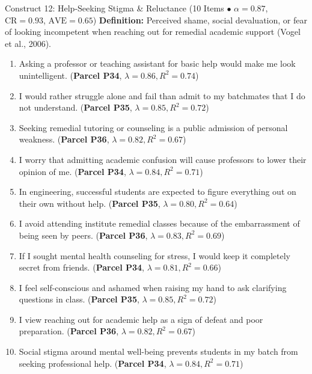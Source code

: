 \documentclass[10pt,a4paper]{article}
\begin{document}
\newpage
\begin{constructbox}{Construct 12: Help-Seeking Stigma \& Reluctance (10 Items $\bullet$ $\alpha = 0.87$, $\text{CR} = 0.93$, $\text{AVE} = 0.65$)}
\textbf{Definition:} Perceived shame, social devaluation, or fear of looking incompetent when reaching out for remedial academic support (Vogel et al., 2006).
\begin{enumerate}[label=\textbf{Q\arabic*.}, leftmargin=2.5em, itemsep=2pt, resume]
  \item Asking a professor or teaching assistant for basic help would make me look unintelligent. \hfill (\textbf{Parcel P34}, $\lambda = 0.86, R^2 = 0.74$)
  \item I would rather struggle alone and fail than admit to my batchmates that I do not understand. \hfill (\textbf{Parcel P35}, $\lambda = 0.85, R^2 = 0.72$)
  \item Seeking remedial tutoring or counseling is a public admission of personal weakness. \hfill (\textbf{Parcel P36}, $\lambda = 0.82, R^2 = 0.67$)
  \item I worry that admitting academic confusion will cause professors to lower their opinion of me. \hfill (\textbf{Parcel P34}, $\lambda = 0.84, R^2 = 0.71$)
  \item In engineering, successful students are expected to figure everything out on their own without help. \hfill (\textbf{Parcel P35}, $\lambda = 0.80, R^2 = 0.64$)
  \item I avoid attending institute remedial classes because of the embarrassment of being seen by peers. \hfill (\textbf{Parcel P36}, $\lambda = 0.83, R^2 = 0.69$)
  \item If I sought mental health counseling for stress, I would keep it completely secret from friends. \hfill (\textbf{Parcel P34}, $\lambda = 0.81, R^2 = 0.66$)
  \item I feel self-conscious and ashamed when raising my hand to ask clarifying questions in class. \hfill (\textbf{Parcel P35}, $\lambda = 0.85, R^2 = 0.72$)
  \item I view reaching out for academic help as a sign of defeat and poor preparation. \hfill (\textbf{Parcel P36}, $\lambda = 0.82, R^2 = 0.67$)
  \item Social stigma around mental well-being prevents students in my batch from seeking professional help. \hfill (\textbf{Parcel P34}, $\lambda = 0.84, R^2 = 0.71$)
\end{enumerate}
\end{constructbox}
\end{document}
